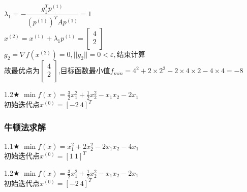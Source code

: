 \begin{solution}
    $\lambda_1=-\dfrac{g_1^Tp^{(1)}}{(p^{(1)})^TAp^{(1)}}=1$\\
    $x^{(2)}=x^{(1)}+\lambda_1p^{(1)}=\begin{bmatrix} 4\\2\\\end{bmatrix}$\\
    $g_2=\nabla f(x^{(2)})=0,||g_2||=0<\varepsilon,\text{结束计算}$\\
    故最优点为$\begin{bmatrix} 4\\2\\\end{bmatrix}$,目标函数最小值$f_{min}=4^2+2\times2^2-2\times4\times2-4\times4=-8$
\end{solution}

\begin{problem}{1.2$\bigstar$}
    $\min f(x)=\frac{3}{2}x_1^2+\frac{1}{2}x_2^2-x_1x_2-2x_1$\\
    初始迭代点${x^{(0)}}=[-2\ 4]^T$
\end{problem}
\begin{solution}


\end{solution}

\subsubsection{牛顿法求解}

\begin{problem}{1.1$\bigstar$}
    $\min f(x)=x_1^2+2x_2^2-2x_1x_2-4x_1$\\
    初始迭代点${x^{(0)}}=[1\ 1]^T$
\end{problem}

\begin{problem}{1.2$\bigstar$}
    $\min f(x)=\frac{3}{2}x_1^2+\frac{1}{2}x_2^2-x_1x_2-2x_1$\\
    初始迭代点${x^{(0)}}=[-2\ 4]^T$
\end{problem}
